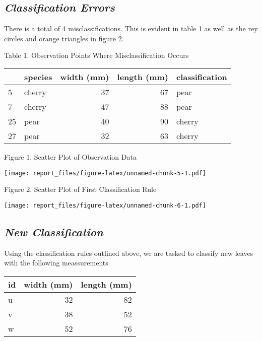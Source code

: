 \documentclass[]{article}
\begin{document}
\subsection{\normalsize{\textit{Classification Errors}}}

There is a total of 4 misclassifications. This is evident in table 1 as
well as the rey circles and orange triangles in figure 2.

Table 1. Observation Points Where Misclassification Occurs

\begin{table}[H]
\centering
\begin{tabular}{l|l|r|r|l}
\hline
  & species & width (mm) & length (mm) & classification\\
\hline
5 & cherry & 37 & 67 & pear\\
\hline
7 & cherry & 47 & 88 & pear\\
\hline
25 & pear & 40 & 90 & cherry\\
\hline
27 & pear & 32 & 63 & cherry\\
\hline
\end{tabular}
\end{table}

\newpage

Figure 1. Scatter Plot of Observation Data

\texttt{[image: report\_files/figure-latex/unnamed-chunk-5-1.pdf]}

Figure 2. Scatter Plot of First Classification Rule

\texttt{[image: report\_files/figure-latex/unnamed-chunk-6-1.pdf]}

\newpage

\subsection{\normalsize{\textit{New Classification}}}

Using the classification rules outlined above, we are tasked to classify
new leaves with the following meassurements

\begin{table}[H]
\centering
\begin{tabular}{l|r|r}
\hline
id & width (mm) & length (mm)\\
\hline
u & 32 & 82\\
\hline
v & 38 & 52\\
\hline
w & 52 & 76\\
\hline
\end{tabular}
\end{table}
\end{document}
